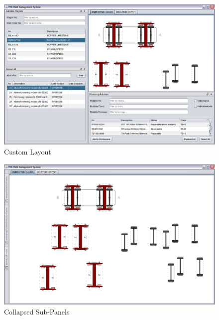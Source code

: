 \begin{figure}[!h]
\centering
\includegraphics[scale=0.37]{chapters/01-user-interface/images/09-workspace-custom-layout.png}
\caption{Custom Layout}\label{fig:09-workspace-custom-layout}
\end{figure}

\begin{figure}[!h]
\centering
\includegraphics[scale=0.37]{chapters/01-user-interface/images/10-workspace-all-collapsed.png}
\caption{Collapsed Sub-Panels}\label{fig:10-workspace-all-collapsed}
\end{figure}
